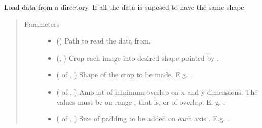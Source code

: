 \documentclass[letterpaper,10pt,english]{sphinxmanual}
\begin{document}
\begin{fulllineitems}
\label{\detokenize{utils/util:utils.util.load_data_from_dir}}
Load data from a directory. If  all the data is suposed to have the same shape.
\begin{quote}\begin{description}
\item[{Parameters}] \leavevmode\begin{itemize}
\item {} 
 () \textendash{} Path to read the data from.

\item {} 
 (, ) \textendash{} Crop each image into desired shape pointed by .

\item {} 
 ( of , ) \textendash{} Shape of the crop to be made. E.g. .

\item {} 
 ( of , ) \textendash{} Amount of minimum overlap on x and y dimensions. The values must  be on range \sphinxcode{\sphinxupquote{{[}0, 1)}}, that is,  or
 of overlap. E. g. .

\item {} 
 ( of , ) \textendash{} Size of padding to be added on each axis . E.g. .


\end{itemize}
\end{description}
\end{quote}
\end{fulllineitems}
\end{document}
